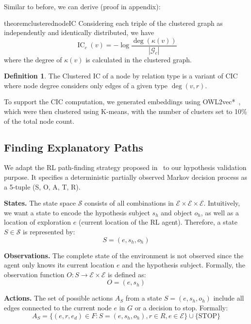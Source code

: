 \documentclass{article}
\theoremstyle{definition}
\newtheorem{definition}{Definition}
\DeclareMathOperator{\IC}{IC}
\DeclareMathOperator{\degree}{deg}
\newcommand{\G}{\mathcal{G}}
\begin{document}
Similar to before, we can derive (proof in appendix):
\begin{restatable}{theorem}{clusterednodeIC}
    \label{thm:clusterednodeIC}
    Considering each triple of the clustered graph as independently and identically distributed, we have
    \begin{equation}
        \IC_c(v) = -\log \frac{\degree(\kappa(v))}{|\G_c|}
    \end{equation}
    where the degree of $\kappa(v)$ is calculated in the clustered graph.
\end{restatable}


\begin{definition}
The Clustered IC of a node by relation type is a variant of CIC where node degree considers only edges of a given type $\degree(v,r)$.
\end{definition} 
To support the CIC computation, we generated embeddings using OWL2vec*~\cite{chen2021owl2vec}, which were then clustered using K-means, with the number of clusters set to 10\% of the total node count. 

\subsection{Finding Explanatory Paths}
We adapt the RL path-finding strategy proposed in~\cite{das2017minerva} to our hypothesis validation purpose. It specifies a deterministic partially observed Markov decision process as a 5-tuple (S, O, A, T, R).

\textbf{States.} The state space $\mathcal{S}$ consists of all combinations in \(\mathcal{E} \times \mathcal{E} \times \mathcal{E}\). Intuitively, we want a state to encode the hypothesis subject $s_h$ and object $o_h$, as well as a location of exploration $e$ (current location of the RL agent). Therefore, a state $S \in \mathcal{S}$ is represented by:
\[
S = (e, s_h, o_h)
\]

\textbf{Observations.} The complete state of the environment is not observed since the agent only knows its current location $e$ and the hypothesis subject. Formally, the observation function $O : S \to \mathcal{E}  \times \mathcal{E}$ is defined as:
\[
O = (e, s_h)
\]

\textbf{Actions.} The set of possible actions \(A_S\) from a state \(S = (e, s_h, o_h)\) include all edges connected to the current node \(e\) in \(G\) or a decision to stop. Formally:
\[
A_S = \{(e, r, e_d) \in F : S = (e, s_h, o_h), r \in R, e \in \mathcal{E} \} \cup \{\text{STOP}\}
\]
\end{document}
